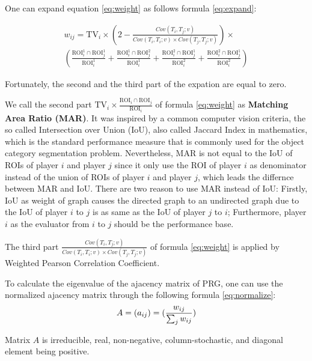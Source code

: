   One can expand equation \ref{eq:weight} as follows formula \ref{eq:expand}:

  \begin{multline}
  \label{eq:expand}
  w_{ij} = \text{TV}_i \times \left(2-\frac{Cov(T_i, T_j; v)}{Cov(T_i, T_i; v)\times Cov(T_j, T_j; v)}\right) \times \\
    \left( \frac{\text{ROI}_i^1\cap\text{ROI}_j^1}{\text{ROI}_i^1}           
    + \frac{\text{ROI}_i^1\cap\text{ROI}_j^2}{\text{ROI}_i^1}           
    + \frac{\text{ROI}_i^2\cap\text{ROI}_j^1}{\text{ROI}_i^2}           
    + \frac{\text{ROI}_i^2\cap\text{ROI}_j^1}{\text{ROI}_i^2} \right)
  \end{multline}

  Fortunately, the second and the third part of the expation are equal to zero.

  We call the second part $\text{TV}_i \times \frac{\text{ROI}_i\cap\text{ROI}_j}{\text{ROI}_i}$ 
  of formula \ref{eq:weight} as \textbf{Matching Area Ratio (MAR)}. 
  It was inspired by a common computer vision criteria,
  the so called Intersection over Union (IoU), also called Jaccard Index in mathematics\cite{real1996probabilistic},
  which is the standard performance measure that is commonly used for the object category segmentation problem.
  Nevertheless, MAR is not equal to the IoU of ROIs of player $i$  and player $j$ since
  it only use the ROI of player $i$ as denominator instead of the union of ROIs of player $i$ and player $j$,
  which leads the differnce between MAR and IoU. There are two reason to use MAR instead of IoU:
  Firstly, IoU as weight of graph causes the directed graph to an undirected graph due to the IoU of player $i$ to $j$
  is as same as the IoU of player $j$ to $i$; Furthermore, player $i$ as the evaluator from $i$ to $j$ 
  should be the performance base.

  The third part $\frac{Cov(T_i, T_j; v)}{Cov(T_i, T_i; v)\times Cov(T_j, T_j; v)}$
  of formula \ref{eq:weight} is applied by Weighted Pearson Correlation Coefficient.
  
  To calculate the eigenvalue of the ajacency matrix of PRG, one can use the normalized ajacency matrix 
  through the following formula \ref{eq:normalize}:
  \begin{equation}
  \label{eq:normalize}
  A = (a_{ij}) = (\frac{w_{ij}}{\sum_{j}{w_{ij}}})\\
  \end{equation}

  \begin{theorem}
  Matrix $A$ is irreducible, real, non-negative, column-stochastic, and diagonal element being positive.
  \end{theorem}

